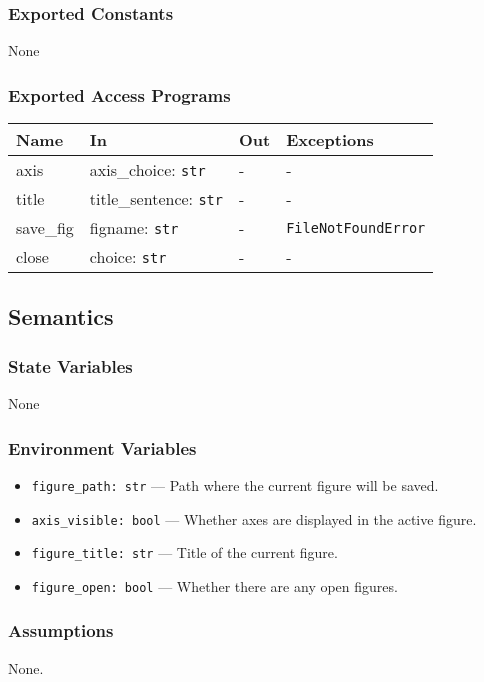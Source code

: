 \documentclass[12pt, titlepage]{article}
\begin{document}
\subsubsection{Exported Constants}
None

\subsubsection{Exported Access Programs}

\begin{center}
\begin{tabular}{p{3.2cm} p{5.5cm} p{4cm} p{2.5cm}}
\hline
\textbf{Name} & \textbf{In} & \textbf{Out} & \textbf{Exceptions} \\
\hline
axis & axis\_choice: \texttt{str} & - & - \\
title & title\_sentence: \texttt{str} & - & - \\
save\_fig & figname: \texttt{str} & - & \texttt{FileNotFoundError} \\
close & choice: \texttt{str} & - & - \\
\hline
\end{tabular}
\end{center}

\subsection{Semantics}

\subsubsection{State Variables}
None

\subsubsection{Environment Variables}
\begin{itemize}
  \item \texttt{figure\_path: str} — Path where the current figure will be saved.
  \item \texttt{axis\_visible: bool} — Whether axes are displayed in the active figure.
  \item \texttt{figure\_title: str} — Title of the current figure.
  \item \texttt{figure\_open: bool} — Whether there are any open figures.
\end{itemize}

\subsubsection{Assumptions}
None.
\end{document}
